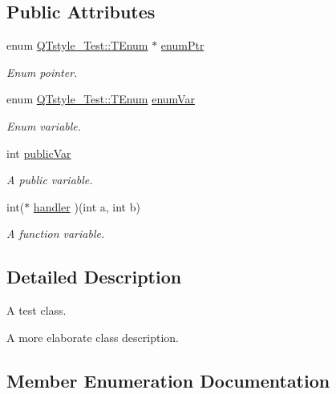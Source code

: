 \subsection*{Public Attributes}
\begin{DoxyCompactItemize}
\item 
enum \hyperlink{classQTstyle__Test_a0525f798cda415a94fedeceb806d2c49}{Q\+Tstyle\+\_\+\+Test\+::\+T\+Enum} $\ast$ \hyperlink{classQTstyle__Test_a973a4566c9a036f4eca508ba5fe80dcb}{enum\+Ptr}
\begin{DoxyCompactList}\small\item\em Enum pointer. \end{DoxyCompactList}\item 
enum \hyperlink{classQTstyle__Test_a0525f798cda415a94fedeceb806d2c49}{Q\+Tstyle\+\_\+\+Test\+::\+T\+Enum} \hyperlink{classQTstyle__Test_adb265d815b43f1f7f0de0e8b8852a5d0}{enum\+Var}
\begin{DoxyCompactList}\small\item\em Enum variable. \end{DoxyCompactList}\item 
int \hyperlink{classQTstyle__Test_aabf7b2e9ed83ea44aca4d213baae06d3}{public\+Var}
\begin{DoxyCompactList}\small\item\em A public variable. \end{DoxyCompactList}\item 
int($\ast$ \hyperlink{classQTstyle__Test_a79dd4e5498f09057775a819d911349e2}{handler} )(int a, int b)
\begin{DoxyCompactList}\small\item\em A function variable. \end{DoxyCompactList}\end{DoxyCompactItemize}


\subsection{Detailed Description}
A test class. 

A more elaborate class description. 

\subsection{Member Enumeration Documentation}
\mbox{\label{classQTstyle__Test_a0525f798cda415a94fedeceb806d2c49}} 

